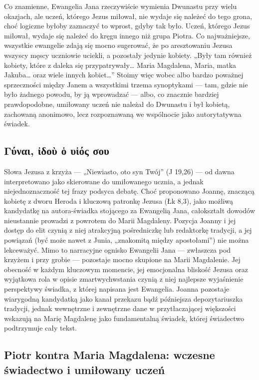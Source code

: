 Co znamienne, Ewangelia Jana rzeczywiście wymienia Dwunastu przy wielu okazjach, ale uczeń, którego Jezus miłował, nie wydaje się należeć do tego grona, choć logiczne byłoby zaznaczyć to wprost, gdyby tak było.
Uczeń, którego Jezus miłował, wydaje się należeć do kręgu innego niż grupa Piotra.
Co najważniejsze, wszystkie ewangelie zdają się mocno sugerować, że po aresztowaniu Jezusa wszyscy męscy uczniowie uciekli, a pozostały jedynie kobiety.
„Były tam również kobiety, które z daleka się przypatrywały\ldots{} Maria Magdalena, Maria, matka Jakuba\ldots{} oraz wiele innych kobiet\ldots{}”
Stoimy więc wobec albo bardzo poważnej sprzeczności między Janem a wszystkimi trzema synoptykami — tam, gdzie nie było żadnego powodu, by ją wprowadzać — albo, co znacznie bardziej prawdopodobne, umiłowany uczeń nie należał do Dwunastu i był kobietą, zachowaną anonimowo, lecz rozpoznawaną we wspólnocie jako autorytatywna świadek.

\subsection{Γύναι, ἰδοὺ ὁ υἱός σου}\label{subsec:ux3b3ux3cdux3b9-ux1f30ux3b4ux3bfux1f7a-ux1f41-ux3c5ux1f31ux3ccux3c2-ux3c3ux3bfux3c5}

Słowa Jezusa z krzyża — „Niewiasto, oto syn Twój” (J 19,26) — od dawna interpretowano jako skierowane do umiłowanego ucznia, a jednak niejednoznaczność tej frazy podsyca debatę.
Choć proponowano Joannę, znaczącą kobietę z dworu Heroda i kluczową patronkę Jezusa (Łk 8,3), jako możliwą kandydatkę na autora-świadka stojącego za Ewangelią Jana, całokształt dowodów nieustannie prowadzi z powrotem do Marii Magdaleny.
Pozycja Joanny i jej dostęp do elit czynią z niej atrakcyjną pośredniczkę lub redaktorkę tradycji, a jej powiązań (być może nawet z Junia, „znakomitą między apostołami”) nie można lekceważyć.
Mimo to narracyjne ognisko Ewangelii Jana — zwłaszcza pod krzyżem i przy grobie — pozostaje mocno skupione na Marii Magdalenie.
Jej obecność w każdym kluczowym momencie, jej emocjonalna bliskość Jezusa oraz wyjątkowa rola w opisie zmartwychwstania czynią z niej najlepsze wyjaśnienie perspektywy świadka, z której napisana jest Ewangelia.
Joanna pozostaje wiarygodną kandydatką jako kanał przekazu bądź późniejsza depozytariuszka tradycji, jednak wewnętrzne i zewnętrzne dane w przytłaczającej większości wskazują na Marię Magdalenę jako fundamentalną świadek, której świadectwo podtrzymuje cały tekst.

\subsection{Piotr kontra Maria Magdalena: wczesne świadectwo i umiłowany uczeń}\label{subsec:peter-vs-mary-magdalene-early-testimony}

